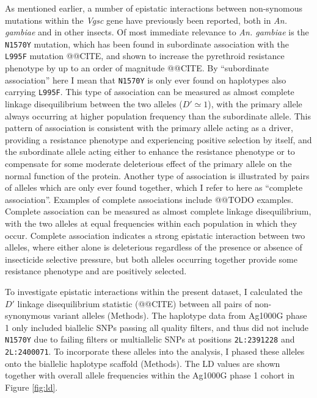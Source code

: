 \documentclass[a4paper,11pt,abstracton,hidelinks]{scrartcl}
\newcommand{\agam}{\textit{An. gambiae}\xspace}
\newcommand{\vgsc}{\textit{Vgsc}\xspace}
\begin{document}
%
As mentioned earlier, a number of epistatic interactions between non-synomous mutations within the \vgsc gene have previously been reported, both in \agam and in other insects.
%
Of most immediate relevance to \agam is the \texttt{N1570Y} mutation, which has been found in subordinate association with the \texttt{L995F} mutation @@CITE, and shown to increase the pyrethroid resistance phenotype by up to an order of magnitude @@CITE.
%
By ``subordinate association'' here I mean that \texttt{N1570Y} is only ever found on haplotypes also carrying \texttt{L995F}.
%
This type of association can be measured as almost complete linkage disequilibrium between the two alleles ($D' \simeq 1$), with the primary allele always occurring at higher population frequency than the subordinate allele.
%
This pattern of association is consistent with the primary allele acting as a driver, providing a resistance phenotype and experiencing positive selection by itself, and the subordinate allele acting either to enhance the resistance phenotype or to compensate for some moderate deleterious effect of the primary allele on the normal function of the protein.
%
Another type of association is illustrated by pairs of alleles which are only ever found together, which I refer to here as ``complete association''.
%
Examples of complete associations include @@TODO examples.
%
Complete association can be measured as almost complete linkage disequilibrium, with the two alleles at equal frequencies within each population in which they occur.
%
Complete association indicates a strong epistatic interaction between two alleles, where either alone is deleterious regardless of the presence or absence of insecticide selective pressure, but both alleles occurring together provide some resistance phenotype and are positively selected.


%
To investigate epistatic interactions within the present dataset, I calculated the $D'$ linkage disequilibrium statistic (@@CITE) between all pairs of non-synonymous variant alleles (Methods).
%
The haplotype data from Ag1000G phase 1 only included biallelic SNPs passing all quality filters, and thus did not include \texttt{N1570Y} due to failing filters or multiallelic SNPs at positions \texttt{2L:2391228} and \texttt{2L:2400071}.
%
To incorporate these alleles into the analysis, I phased these alleles onto the biallelic haplotype scaffold (Methods).
%
The LD values are shown together with overall allele frequencies within the Ag1000G phase 1 cohort in Figure \ref{fig:ld}.
\end{document}
